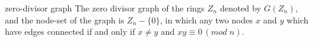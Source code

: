 \begin{definition}{zero-divisor graph}
The zero divisor graph of the rings ${Z_{n}}$ denoted by $G{(Z_{n})}$, and the node-set of the graph is $Z_{n}-\{0\}$, in which any two nodes $x$ and $y$ which have edges connected if and only if $x\neq y$ and ${xy\equiv 0\,(mod\;n)}$.
\end{definition}